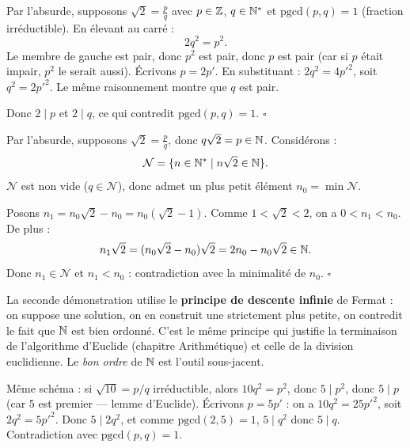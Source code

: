 \begin{proofbox}
Par l'absurde, supposons $\sqrt{2} = \frac{p}{q}$ avec $p \in \mathbb{Z}$, $q \in \mathbb{N}^*$ et $\text{pgcd}(p, q) = 1$ (fraction irréductible). En élevant au carré :
\[
  2 q^2 = p^2.
\]
Le membre de gauche est pair, donc $p^2$ est pair, donc $p$ est pair (car si $p$ était impair, $p^2$ le serait aussi). Écrivons $p = 2 p'$. En substituant : $2 q^2 = 4 p'^2$, soit $q^2 = 2 p'^2$. Le même raisonnement montre que $q$ est pair.

Donc $2 \mid p$ et $2 \mid q$, ce qui contredit $\text{pgcd}(p, q) = 1$. \hfill$\square$
\end{proofbox}

\begin{proofbox}
Par l'absurde, supposons $\sqrt{2} = \frac{p}{q}$, donc $q\sqrt{2} = p \in \mathbb{N}$. Considérons :
\[
  \mathcal{N} = \{ n \in \mathbb{N}^* \mid n\sqrt{2} \in \mathbb{N} \}.
\]
$\mathcal{N}$ est non vide ($q \in \mathcal{N}$), donc admet un plus petit élément $n_0 = \min \mathcal{N}$.

Posons $n_1 = n_0 \sqrt{2} - n_0 = n_0 (\sqrt{2} - 1)$. Comme $1 < \sqrt{2} < 2$, on a $0 < n_1 < n_0$.
De plus :
\[
  n_1 \sqrt{2} = (n_0 \sqrt{2} - n_0)\sqrt{2} = 2 n_0 - n_0 \sqrt{2} \in \mathbb{N}.
\]
Donc $n_1 \in \mathcal{N}$ et $n_1 < n_0$ : contradiction avec la minimalité de $n_0$. \hfill$\square$
\end{proofbox}

\begin{intuitionbox}
La seconde démonstration utilise le \textbf{principe de descente infinie} de Fermat : on suppose une solution, on en construit une strictement plus petite, on contredit le fait que $\mathbb{N}$ est bien ordonné. C'est le même principe qui justifie la terminaison de l'algorithme d'Euclide (chapitre Arithmétique) et celle de la division euclidienne. Le \emph{bon ordre} de $\mathbb{N}$ est l'outil sous-jacent.
\end{intuitionbox}

\begin{exbox}
Même schéma : si $\sqrt{10} = p/q$ irréductible, alors $10 q^2 = p^2$, donc $5 \mid p^2$, donc $5 \mid p$ (car $5$ est premier --- lemme d'Euclide). Écrivons $p = 5 p'$ : on a $10 q^2 = 25 p'^2$, soit $2 q^2 = 5 p'^2$. Donc $5 \mid 2 q^2$, et comme $\text{pgcd}(2, 5) = 1$, $5 \mid q^2$ donc $5 \mid q$. Contradiction avec $\text{pgcd}(p, q) = 1$.
\end{exbox}


